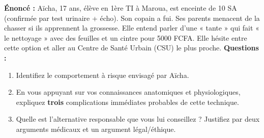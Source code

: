 \documentclass[11pt]{article}
\begin{document}
\begin{exoresolu}
\textbf{Énoncé :} Aïcha, 17 ans, élève en 1ère TI à Maroua, est enceinte de 10 SA (confirmée par test urinaire + écho). Son copain a fui. Ses parents menacent de la chasser si ils apprennent la grossesse. Elle entend parler d'une « tante » qui fait « le nettoyage » avec des feuilles et un cintre pour 5000 FCFA. Elle hésite entre cette option et aller au Centre de Santé Urbain (CSU) le plus proche.
\textbf{Questions :}
\begin{enumerate}
    \item Identifiez le comportement à risque envisagé par Aïcha.
    \item En vous appuyant sur vos connaissances anatomiques et physiologiques, expliquez \textbf{trois} complications immédiates probables de cette technique.
    \item Quelle est l'alternative responsable que vous lui conseillez ? Justifiez par deux arguments médicaux et un argument légal/éthique.
\end{enumerate}


\end{exoresolu}
\end{document}
